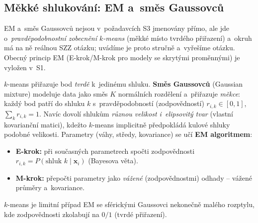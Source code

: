 \subsection{Měkké shlukování: EM a~směs Gaussovců}\label{ssec:em}

\begin{poznamka}[Zařazení]
EM a~směs Gaussovců nejsou v~požadavcích S3 jmenovány přímo, ale jde o~\emph{pravděpodobnostní zobecnění $k$-means} (měkké místo tvrdého přiřazení) a~okruh má na ně reálnou SZZ otázku; uvádíme je proto stručně a~vyřešíme otázku. Obecný princip EM (E-krok/M-krok pro modely se skrytými proměnnými) je vyložen v~S1.
\end{poznamka}

$k$-means přiřazuje bod \emph{tvrdě} k~jedinému shluku. \textbf{Směs Gaussovců} (Gaussian mixture) modeluje data jako směs $K$ normálních rozdělení a~přiřazuje \emph{měkce}: každý bod patří do shluku $k$ s~pravděpodobností (zodpovědností) $r_{i,k}\in[0,1]$, $\sum_k r_{i,k}=1$. Navíc dovolí shlukům \emph{různou velikost i~elipsovitý tvar} (vlastní kovarianční matici), kdežto $k$-means implicitně předpokládá kulové shluky podobné velikosti. Parametry (váhy, středy, kovariance) se učí \textbf{EM algoritmem}:
\begin{itemize}
  \item \textbf{E-krok:} při současných parametrech spočti zodpovědnosti $r_{i,k}=P(\text{shluk }k\mid\mathbf{x}_i)$ (Bayesova věta).
  \item \textbf{M-krok:} přepočti parametry jako \emph{vážené} (zodpovědnostmi) odhady -- vážené průměry a~kovariance.
\end{itemize}
$k$-means je limitní případ EM se sférickými Gaussovci nekonečně malého rozptylu, kde zodpovědnosti zkolabují na $0/1$ (tvrdé přiřazení).

